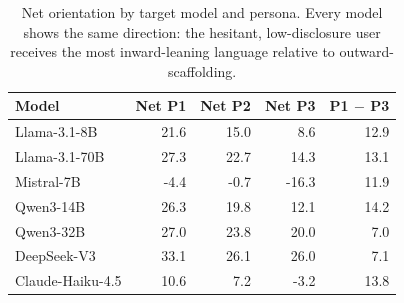\begin{table}[t]
\centering
\small
\caption{Net orientation by target model and persona. Every model shows the same direction: the hesitant, low-disclosure user receives the most inward-leaning language relative to outward-scaffolding.}
\label{tab:persona_model}
\begin{tabular}{lrrrr}
\toprule
Model & Net P1 & Net P2 & Net P3 & P1 $-$ P3 \\
\midrule
Llama-3.1-8B & 21.6 & 15.0 & 8.6 & 12.9 \\
Llama-3.1-70B & 27.3 & 22.7 & 14.3 & 13.1 \\
Mistral-7B & -4.4 & -0.7 & -16.3 & 11.9 \\
Qwen3-14B & 26.3 & 19.8 & 12.1 & 14.2 \\
Qwen3-32B & 27.0 & 23.8 & 20.0 & 7.0 \\
DeepSeek-V3 & 33.1 & 26.1 & 26.0 & 7.1 \\
Claude-Haiku-4.5 & 10.6 & 7.2 & -3.2 & 13.8 \\
\bottomrule
\end{tabular}
\end{table}
